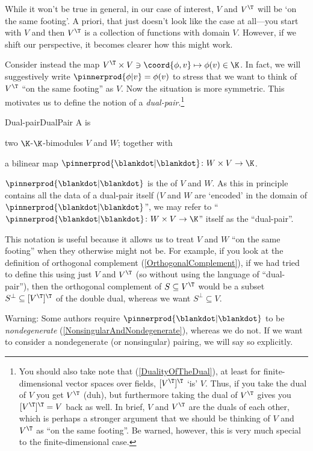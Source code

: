While it won't be true in general, in our case of interest, $V$ and $V^{\T}$ will be `on the same footing'.  A priori, that just doesn't look like the case at all---you start with $V$ and then $V^{\T}$ is a collection of functions with domain $V$.  However, if we shift our perspective, it becomes clearer how this might work.

Consider instead the map $V^{\T}\times V\ni \coord{\phi ,v}\mapsto \phi (v)\in \K$.  In fact, we will suggestively write $\pinnerprod{\phi |v}=\phi (v)$ to stress that we want to think of $V^{\T}$ ``on the same footing'' as $V$.  Now the situation is more symmetric.  This motivates us to define the notion of a \emph{dual-pair}.\footnote{You should also take note that (\cref{DualityOfTheDual}), at least for finite-dimensional vector spaces over fields, $[V^{\T}]^{\T}$ `is' $V$.  Thus, if you take the dual of $V$ you get $V^{\T}$ (duh), but furthermore taking the dual of $V^{\T}$ gives you $[V^{\T}]^{\T}=V$ back as well.  In brief, $V$ and $V^{\T}$ are the duals of each other, which is perhaps a stronger argument that we should be thinking of $V$ and $V^{\T}$ as ``on the same footing''.  Be warned, however, this is very much special to the finite-dimensional case.}
\begin{dfn}{Dual-pair}{DualPair}	
	A  is
	\begin{data}
		\item two $\K$-$\K$-bimodules $V$ and $W$; together with
		\item a bilinear map $\pinnerprod{\blankdot |\blankdot} \colon W\times V\rightarrow \K$\index[notation]{$\pinnerprod{\blankdot |\blankdot}$}.
	\end{data}
	\begin{rmk}
		$\pinnerprod{\blankdot |\blankdot}$ is the  of $V$ and $W$.  As this in principle contains all the data of a dual-pair itself ($V$ and $W$ are `encoded' in the domain of $\pinnerprod{\blankdot |\blankdot}$'', we may refer to ``$\pinnerprod{\blankdot |\blankdot}\colon W\times V\rightarrow \K$'' itself as the ``dual-pair''.
	\end{rmk}
	\begin{rmk}
		This notation is useful because it allows us to treat $V$ and $W$ ``on the same footing'' when they otherwise might not be.  For example, if you look at the definition of orthogonal complement (\cref{OrthogonalComplement}), if we had tried to define this using just $V$ and $V^{\T}$ (so without using the language of ``dual-pair''), then the orthogonal complement of $S\subseteq V^{\T}$ would be a subset $S^{\perp}\subseteq [V^{\T}]^{\T}$ of the double dual, whereas we want $S^{\perp}\subseteq V$.
	\end{rmk}
	\begin{rmk}
		Warning:  Some authors require $\pinnerprod{\blankdot |\blankdot}$ to be \emph{nondegenerate} (\cref{NonsingularAndNondegenerate}), whereas we do not.  If we want to consider a nondegenerate (or nonsingular) pairing, we will say so explicitly.
	\end{rmk}
\end{dfn}
